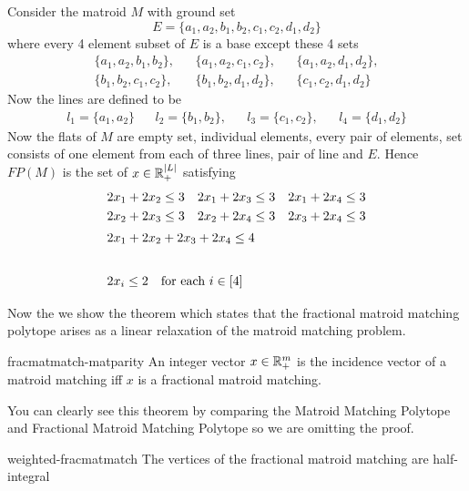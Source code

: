 \begin{example}{}{}
	Consider the matroid $M$ with ground set $$E=\{a_1,a_2,b_1,b_2,c_1,c_2,d_1,d_2\}$$where every 4 element subset of $E$ is a base except these 4 sets \begin{align*}
		\{a_1,a_2,b_1,b_2\}, && \{a_1,a_2,c_1,c_2\}, && \{a_1,a_2,d_1,d_2\},\\
		\{b_1,b_2,c_1,c_2\}, && \{b_1,b_2,d_1,d_2\}, && \{c_1,c_2,d_1,d_2\}
	\end{align*}Now the lines are  defined to be \begin{align*}
	l_1=\{a_1,a_2\} && l_2=\{b_1,b_2\}, && l_3=\{c_1,c_2\}, && l_4=\{d_1,d_2\}
	\end{align*} Now the flats of $M$ are empty set, individual elements, every pair of elements, set consists of one element from each of three lines, pair of line and $E$. Hence $FP(M)$ is the set of $x\in\mathbb{R}^{|L|}_+$ satisfying \begin{align*}
	2x_1+2x_2\leq 3 && 2x_1+2x_3\leq 3 && 2x_1+2x_4\leq 3\\
	2x_2+2x_3\leq 3 && 2x_2+2x_4\leq 3 && 2x_3+2x_4\leq 3\\
	\shortintertext{\centering $2x_1+2x_2+2x_3+2x_4\leq 4$} \\
	\shortintertext{\centering $2x_i\leq 2\quad \text{for each $i\in[4]$}$}
	\end{align*}
\end{example}
Now the we show the theorem  which states that the fractional matroid matching polytope arises
as a linear relaxation of the matroid matching problem. 
\begin{Theorem}{\cite[Theoerm 2.1]{VandeVate_1992_Fmm}}{fracmatmatch-matparity}
	An integer vector $x\in\mathbb{R}^{m}_+$ is the incidence  vector of a matroid matching iff $x$ is a fractional matroid matching. 
\end{Theorem}
You can clearly see this theorem by comparing the Matroid Matching Polytope and Fractional Matroid Matching Polytope so we are omitting the proof.
\begin{Theorem}{\cite[Theorem 1]{GijswijtPap_2013_Aaf}}{weighted-fracmatmatch}
	The vertices of the fractional matroid matching are half-integral
\end{Theorem}
